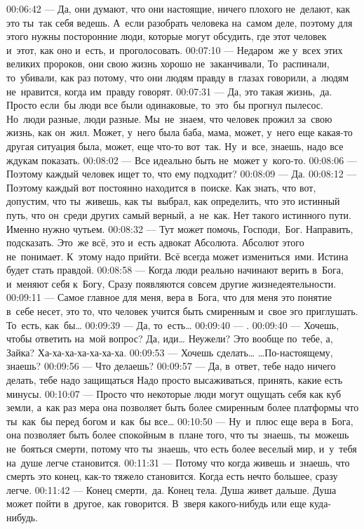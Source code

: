 00:06:42 — Да, они думают, что они настоящие, ничего плохого не делают, как это ты так себя ведешь. А если разобрать человека на самом деле, поэтому для этого нужны посторонние люди, которые могут обсудить, где этот человек и этот, как оно и есть, и проголосовать.
00:07:10 — Недаром же у всех этих великих пророков, они свою жизнь хорошо не заканчивали, То распинали, то убивали, как раз потому, что они людям правду в глазах говорили, а людям не нравится, когда им правду говорят.
00:07:31 — Да, это такая жизнь, да. Просто если бы люди все были одинаковые, то это бы прогнул пылесос. Но люди разные, люди разные. Мы не знаем, что человек прожил за свою жизнь, как он жил. Может, у него была баба, мама, может, у него еще какая-то другая ситуация была, может, еще что-то вот так. Ну и все, знаешь, надо все ждукам показать.
00:08:02 — Все идеально быть не может у кого-то.
00:08:06 — Поэтому каждый человек ищет то, что ему подходит?
00:08:09 — Да.
00:08:12 — Поэтому каждый вот постоянно находится в поиске. Как знать, что вот, допустим, что ты живешь, как ты выбрал, как определить, что это истинный путь, что он среди других самый верный, а не как. Нет такого истинного пути. Именно нужно чутьем.
00:08:32 — Тут может помочь, Господи, Бог. Направить, подсказать. Это же всё, это и есть адвокат Абсолюта. Абсолют этого не понимает. К этому надо прийти. Всё всегда может измениться ими. Истина будет стать правдой.
00:08:58 — Когда люди реально начинают верить в Бога, и меняют себя к Богу, Сразу появляются совсем другие жизнедеятельности.
00:09:11 — Самое главное для меня, вера в Бога, что для меня это понятие в себе несет, это то, что человек учится быть смиренным и свое эго приглушать. То есть, как бы…
00:09:39 — Да, то есть…
00:09:40 — .
00:09:40 — Хочешь, чтобы ответить на мой вопрос? Да, иди… Неужели? Это вообще по тебе, а, Зайка? Ха-ха-ха-ха-ха-ха-ха.
00:09:53 — Хочешь сделать… …По-настоящему, знаешь?
00:09:56 — Что делаешь?
00:09:57 — Да, в ответ, тебе надо ничего делать, тебе надо защищаться Надо просто высаживаться, принять, какие есть минусы.
00:10:07 — Просто что некоторые люди могут ощущать себя как куб земли, а как раз мера она позволяет быть более смиренным более платформы что ты как бы перед богом и как бы все…
00:10:50 — Ну и плюс еще вера в Бога, она позволяет быть более спокойным в плане того, что ты знаешь, ты можешь не бояться смерти, потому что ты знаешь, что есть более веселый мир, и у тебя на душе легче становится.
00:11:31 — Потому что когда живешь и знаешь, что смерть это конец, как-то тяжело становится. Когда есть нечто большее, сразу легче.
00:11:42 — Конец смерти, да. Конец тела. Душа живет дальше. Душа может пойти в другое, как говорится. В зверя какого-нибудь или еще куда-нибудь.
